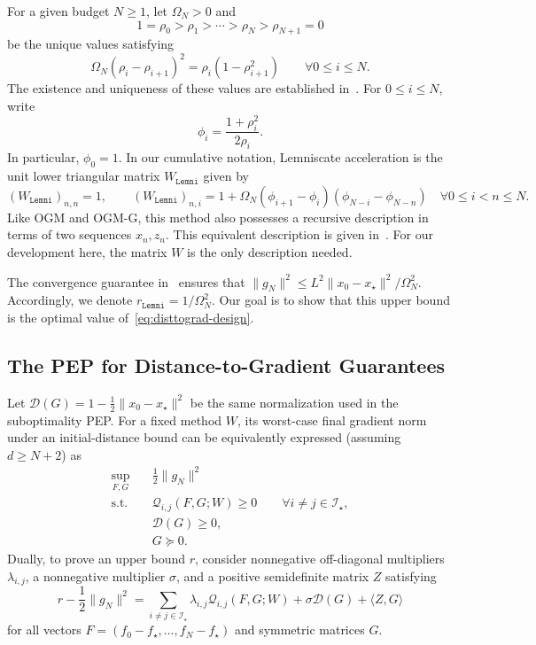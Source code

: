\documentclass[11pt]{article}
\begin{document}
For a given budget $N\geq1$, let $\Omega_N>0$ and
\[
    1=\rho_0>\rho_1>\cdots>\rho_N>\rho_{N+1}=0
\]
be the unique values satisfying
\begin{equation}\label{eq:lemni-rate-recursion}
    \Omega_N(\rho_i-\rho_{i+1})^2
    =\rho_i(1-\rho_{i+1}^2)
    \qquad \forall 0\leq i\leq N.
\end{equation}
The existence and uniqueness of these values are established in~\cite{KimRyuDasGupta26}. For $0\leq i\leq N$, write
\begin{equation*}
    \phi_i=\frac{1+\rho_i^2}{2\rho_i}.
\end{equation*}
In particular, $\phi_0=1$. In our cumulative notation, Lemniscate acceleration is the unit lower triangular matrix $W_\mathtt{Lemni}$ given by
\begin{equation}\label{eq:lemni-W}
    (W_\mathtt{Lemni})_{n,n}=1,
    \qquad
    (W_\mathtt{Lemni})_{n,i}
    =1+\Omega_N(\phi_{i+1}-\phi_i)
      (\phi_{N-i}-\phi_{N-n})
    \quad \forall 0\leq i<n\leq N.
\end{equation}
Like OGM and OGM-G, this method also possesses a recursive description in terms of two sequences $x_n,z_n$. This equivalent description is given in~\cite{KimRyuDasGupta26}. For our development here, the matrix $W$ is the only description needed.

The convergence guarantee in~\cite{KimRyuDasGupta26} ensures that $\|g_N\|^2\leq L^2\|x_0-x_\star\|^2/\Omega_N^2$.
Accordingly, we denote $r_\mathtt{Lemni}=1/\Omega_N^2$.
Our goal is to show that this upper bound is the optimal value of~\eqref{eq:disttograd-design}.

\subsection{The PEP for Distance-to-Gradient Guarantees}

Let $\mathcal D(G)=1-\frac12\|x_0-x_\star\|^2$ be the same normalization used in the suboptimality PEP. For a fixed method $W$, its worst-case final gradient norm under an initial-distance bound can be equivalently expressed (assuming $d\geq N+2$) as
\begin{equation}\label{eq:lemni-PEP-SDP}
\begin{aligned}
    \sup_{F,G}\quad &\frac12\|g_N\|^2\\
    \mathrm{s.t.}\quad
    &\mathcal Q_{i,j}(F,G;W)\geq0
    \qquad \forall i\neq j\in\mathcal I_\star,\\
    &\mathcal D(G)\geq0,\\
    &G\succeq0.
\end{aligned}
\end{equation}
Dually, to prove an upper bound $r$, consider nonnegative off-diagonal
multipliers $\lambda_{i,j}$, a nonnegative multiplier $\sigma$, and a positive
semidefinite matrix $Z$ satisfying
\begin{equation}\label{eq:lemni-main-identity}
    r-\frac12\|g_N\|^2
    =\sum_{i\neq j\in\mathcal I_\star}\lambda_{i,j}
      \mathcal Q_{i,j}(F,G;W)
      +\sigma\mathcal D(G)+\langle Z,G\rangle
\end{equation}
for all vectors $F=(f_0-f_\star,\dots,f_N-f_\star)$ and symmetric matrices $G$.
\end{document}
